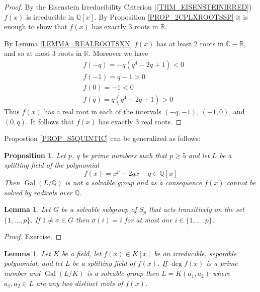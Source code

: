 \documentclass[12pt, letterpaper, oneside]{article}
\theoremstyle{plain}
\newtheorem{lemma}[theorem]{Lemma}
\newtheorem{proposition}[theorem]{Proposition}
\theoremstyle{definition}
\newcommand{\Q}{{\mathbb Q}}
\newcommand{\R}{{\mathbb R}}
\newcommand{\C}{{\mathbb C}}
\newcommand{\Gal}{\operatorname{Gal}}
\newcommand{\vs}{\vskip 5mm}
\begin{document}
\vs

\begin{proof}
By the Eisenstein Irreducibility Criterion (\ref{THM_EISENSTEINIRRED}) $f(x)$ is irreducible 
in $\Q[x]$. By Proposition \ref{PROP_2CPLXROOTSSP} it is enough to show that $f(x)$ has 
exactly 3 roots in $\R$. 

By Lemma \ref{LEMMA_REALROOTSXN} $f(x)$ has at least 2 roots in $\C-\R$, and so 
at most 3 roots in $\R$. Moreover we have 
\begin{align*}
& f(-q)  = -q(q^{4}-2q+1) < 0 \\  
& f(-1)  = q-1 > 0 \\ 
& f(0)  = -1 < 0 \\ 
& f(q)  = q(q^{4}-2q+1) > 0
\end{align*}
Thus $f(x)$ has a real root in each of the intervals $(-q, -1)$, $(-1, 0)$, and $(0, q)$. 
It follows that $f(x)$ has exactly 3 real roots.  
\end{proof}


\vs\vs


Propostion \ref{PROP_S5QUINTIC} can be generalized as follows:

\begin{proposition}
\label{PROP_NONRADPDEGPOLY}
Let $p$, $q$ be  prime numbers such that $p\geq 5$ 
and let $L$ be a splitting field of the polynomial 
$$f(x) = x^{p} - 2qx -q \in \Q[x]$$
Then $\Gal(L/\Q)$ is not a solvable group and  as a consequence 
$f(x)$ cannot be solved by radicals over $\Q$. 
\end{proposition}


\vs\vs

\begin{lemma}
\label{LEMMA_SOLVTRANSACTION}
Let $G$ be a solvable subgroup of $S_{p}$ that acts transitively on the set 
$\{1, \dots, p\}$. If $1\neq \sigma\in G$ then $\sigma(i) = i$ for at most one
$i\in \{1, \dots, p\}$.
\end{lemma}

\vs 

\begin{proof}
Exercise. 
\end{proof}


\vs\vs

\begin{lemma}
\label{LEMMA_SOLVGALGP2ROOTS}
Let $K$ be a field, let $f(x)\in K[x]$ be an irreducible, separable polynomial, 
and let $L$ be a splitting field of  $f(x)$. If $\deg f(x)$ is a prime number and 
$\Gal(L/K)$ is a solvable group then $L= K(a_{1}, a_{2})$ where $a_{1}, a_{2}\in L$
are any two distinct roots of $f(x)$. 
\end{lemma}
\end{document}
